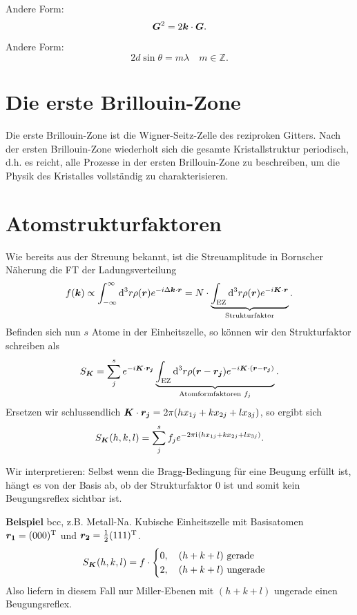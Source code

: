 Andere Form:
\begin{equation*}
	\boldsymbol{G}^2 = 2\boldsymbol{k}\cdot\boldsymbol{G}.
\end{equation*}

Andere Form:
\begin{equation*}
	2d\sin\theta = m\lambda\quad m\in\mathbb{Z}.
\end{equation*}

\section{Die erste Brillouin-Zone}
Die erste Brillouin-Zone ist die Wigner-Seitz-Zelle des reziproken Gitters.
Nach der ersten Brillouin-Zone wiederholt sich die gesamte Kristallstruktur periodisch, d.h. es reicht, alle Prozesse in der ersten Brillouin-Zone zu beschreiben, um die Physik des Kristalles vollständig zu charakterisieren.

\section{Atomstrukturfaktoren}
Wie bereits aus der Streuung bekannt, ist die Streuamplitude in Bornscher Näherung die FT der Ladungsverteilung
\begin{equation*}
	f(\boldsymbol{k})\propto\int_{-\infty}^\infty\text{d}^3r\rho(\boldsymbol{r})e^{-i\Delta\boldsymbol{k}\cdot\boldsymbol{r}} = N\cdot\underbrace{\int_\text{EZ}\text{d}^3r\rho(\boldsymbol{r})e^{-i\boldsymbol{K}\cdot\boldsymbol{r}}}_\text{Strukturfaktor}.
\end{equation*}
Befinden sich nun $s$ Atome in der Einheitszelle, so können wir den Strukturfaktor schreiben als
\begin{equation*}
	S_{\boldsymbol{K}} = \sum_j^se^{-i\boldsymbol{K}\cdot\boldsymbol{r_j}}\underbrace{\int_\text{EZ}\text{d}^3r\rho(\boldsymbol{r}-\boldsymbol{r_j})e^{-i\boldsymbol{K}\cdot(\boldsymbol{r}-\boldsymbol{r_j})}}_\text{Atomformfaktoren $f_j$}.
\end{equation*}
Ersetzen wir schlussendlich $\boldsymbol{K}\cdot\boldsymbol{r_j} = 2\pi(hx_{1j} + kx_{2j} + lx_{3j})$, so ergibt sich
\begin{equation*}
	S_{\boldsymbol{K}}(h,k,l) = \sum_j^sf_je^{-2\pi\mathrm{i}\mkern1mu(hx_{1j} + kx_{2j} + lx_{3j})}.
\end{equation*}

Wir interpretieren:
Selbst wenn die Bragg-Bedingung für eine Beugung erfüllt ist, hängt es von der Basis ab, ob der Strukturfaktor 0 ist und somit kein Beugungsreflex sichtbar ist.

\textbf{Beispiel}  bcc, z.B. Metall-Na. Kubische Einheitszelle mit Basisatomen $\boldsymbol{r_1} = (000)^\text{T}$ und $\boldsymbol{r_2} = \frac{1}{2}(111)^\text{T}$.
\begin{equation*}
	S_{\boldsymbol{K}}(h,k,l) = f\cdot\begin{cases}
																0,\quad(h+k+l)\text{ gerade} \\
																2,\quad(h+k+l)\text{ ungerade}
															\end{cases}
\end{equation*}
Also liefern in diesem Fall nur Miller-Ebenen mit $(h+k+l)$ ungerade einen Beugungsreflex.

